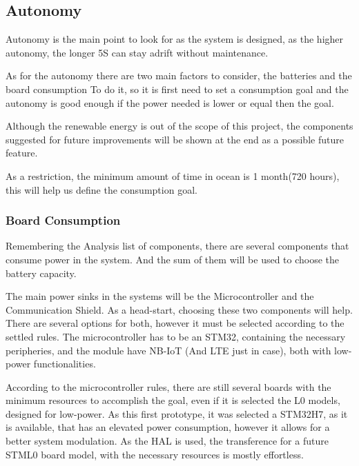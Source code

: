 \subsection{Autonomy}
Autonomy is the main point to look for as the system is designed, as the higher autonomy, 
the longer 5S can stay adrift without maintenance.

As for the autonomy there are two main factors to consider, the batteries and the board 
consumption To do it, so it is first need to set a consumption goal and the autonomy is 
good enough if the power needed is lower or equal then the goal.

Although the renewable energy is out of the scope of this project, the components suggested
for future improvements will be shown at the end as a possible future feature. 

As a restriction, the minimum amount of time in ocean is 1 month(720 hours), this will help us 
define the consumption goal.

\subsubsection{Board Consumption}
\label{link:Board Consumption}
Remembering the Analysis list of components, there are several components that consume
power in the system. And the sum of them will be used to choose the battery capacity.

The main power sinks in the systems will be the Microcontroller and the 
Communication Shield. As a head-start, choosing these two components will help. There are
several options for both, however it must be selected according to the settled rules. The
microcontroller has to be an STM32, containing the necessary peripheries, and the module have NB-IoT (And LTE just in case), both
with low-power functionalities.

According to the microcontroller rules, there are still several boards with the minimum
resources to accomplish the goal, even if it is selected the L0 models, designed for 
low-power. As this first prototype, it was selected a STM32H7, as it is available, 
that has an elevated power consumption, however it allows for a better system 
modulation. As the HAL is used, the transference for a future STML0 board model, 
with the necessary resources is mostly effortless. 


